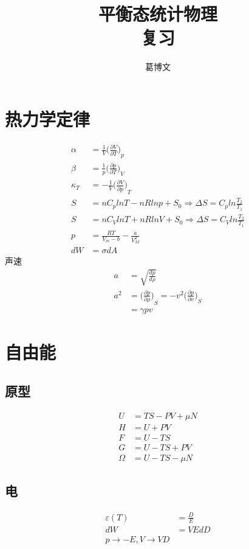 \documentclass[a4paper,12pt]{article}
\newcommand{\myPartial}[3]{{\bigg(\frac{\partial {#1}}{\partial {#2}}\bigg)}_{#3}}
\begin{document}
\begin{CJK*}{UTF8}{gbsn}

\title{\textbf{平衡态统计物理\\复习}}
\author{葛博文}
\date{\number{}\number{}\number{}}
\maketitle

\begin{spacing}{1.3}
\setcounter{section}{0}
\section{热力学定律}
\begin{align}
  \alpha &= \frac{1}{V}\myPartial{V}{T}{p}\\
  \beta &= \frac{1}{p}\myPartial{p}{T}{V}\\
  \kappa_T &= -\frac{1}{V}\myPartial{V}{p}{T}\\
  S &= nC_p lnT - nRlnp +S_0 \Rightarrow \Delta S= C_p ln\frac{T_2}{T_1}\\
  S &= nC_V lnT + nRlnV +S_0 \Rightarrow \Delta S= C_V ln\frac{T_2}{T_1}\\
  p &= \frac{RT}{V_m-b}-\frac{a}{V_M^2}\\
  dW &= \sigma dA
\end{align}
\indent 声速
\begin{align}
  a &= \sqrt{\frac{dp}{d\rho}}\\
  a^2 &= \myPartial{p}{\rho}{S} = -v^2\myPartial{p}{v}{S}\\
  &= \gamma pv
\end{align}

\section{自由能}
\subsection{原型}
\begin{align}
  U &= TS - PV +\mu N\\
  H &= U + PV\\
  F &= U - TS\\
  G &= U - TS + PV\\
  \Omega &= U - TS - \mu N
\end{align}

\subsection{电}
\begin{align}
      \varepsilon (T) &= \frac{D}{E}\\
      dW &= VEdD\\
      p \rightarrow -E, V \rightarrow VD
\end{align}


\end{spacing}
\end{CJK*}
\end{document}
